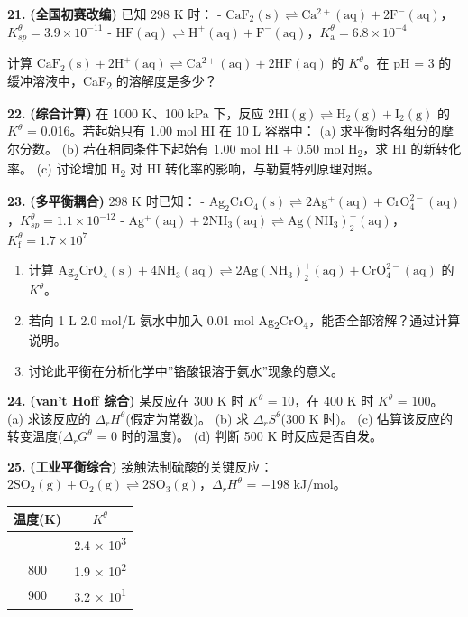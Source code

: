 \documentclass[a4paper,11pt]{ctexart}
\providecommand{\tightlist}{\setlength{\itemsep}{0pt}\setlength{\parskip}{0pt}}
\newcounter{none}
\newcommand{\箭}{\ensuremath{\rightarrow}}
\newcommand{\左箭}{\ensuremath{\leftarrow}}
\newcommand{\上箭}{\ensuremath{\uparrow}}
\newcommand{\下箭}{\ensuremath{\downarrow}}
\newcommand{\衡}{\ensuremath{\rightleftharpoons}}
\newcommand{\双箭}{\ensuremath{\leftrightarrow}}
\newcommand{\约等于}{\ensuremath{\approx}}
\newcommand{\小于等于}{\ensuremath{\leq}}
\newcommand{\大于等于}{\ensuremath{\geq}}
\newcommand{\不等于}{\ensuremath{\neq}}
\newcommand{\西格马}{\ensuremath{\sigma}}
\newcommand{\派}{\ensuremath{\pi}}
\begin{document}
\textbf{21.} \textbf{(全国初赛改编)} 已知 298 K 时：
- \(\mathrm{CaF_2(s) \rightleftharpoons Ca^{2+}(aq) + 2F^-(aq)}\)，\(K_{sp}^\theta = 3.9 \times 10^{-11}\)
- \(\mathrm{HF(aq) \rightleftharpoons H^+(aq) + F^-(aq)}\)，\(K_{\mathrm a}^\theta = 6.8 \times 10^{-4}\)

计算 \(\mathrm{CaF_2(s) + 2H^+(aq) \rightleftharpoons Ca^{2+}(aq) + 2HF(aq)}\) 的 \(K^\theta\)。在 pH = 3 的缓冲溶液中，CaF\textsubscript{2} 的溶解度是多少？

\textbf{22.} \textbf{(综合计算)} 在 1000 K、100 kPa 下，反应 \(\mathrm{2HI(g) \rightleftharpoons H_2(g) + I_2(g)}\) 的 \(K^\theta\) = 0.016。若起始只有 1.00 mol HI 在 10 L 容器中：
(a) 求平衡时各组分的摩尔分数。
(b) 若在相同条件下起始有 1.00 mol HI + 0.50 mol H\textsubscript{2}，求 HI 的新转化率。
(c) 讨论增加 H\textsubscript{2} 对 HI 转化率的影响，与勒夏特列原理对照。

\textbf{23.} \textbf{(多平衡耦合)} 298 K 时已知：
- \(\mathrm{Ag_2CrO_4(s) \rightleftharpoons 2Ag^+(aq) + CrO_4^{2-}(aq)}\)，\(K_{sp}^\theta = 1.1 \times 10^{-12}\)
- \(\mathrm{Ag^+(aq) + 2NH_3(aq) \rightleftharpoons Ag(NH_3)_2^+(aq)}\)，\(K_{\mathrm f}^\theta = 1.7 \times 10^7\)

\begin{enumerate}
\def\labelenumi{(\alph{enumi})}
\tightlist
\item
  计算 \(\mathrm{Ag_2CrO_4(s) + 4NH_3(aq) \rightleftharpoons 2Ag(NH_3)_2^+(aq) + CrO_4^{2-}(aq)}\) 的 \(K^\theta\)。
\item
  若向 1 L 2.0 mol/L 氨水中加入 0.01 mol Ag\textsubscript{2}CrO\textsubscript{4}，能否全部溶解？通过计算说明。
\item
  讨论此平衡在分析化学中''铬酸银溶于氨水''现象的意义。
\end{enumerate}

\textbf{24.} \textbf{(van't Hoff 综合)} 某反应在 300 K 时 \(K^\theta\) = 10，在 400 K 时 \(K^\theta\) = 100。
(a) 求该反应的 \(\Delta_r H^\theta\)(假定为常数)。
(b) 求 \(\Delta_r S^\theta\)(300 K 时)。
(c) 估算该反应的转变温度(\(\Delta_r G^\theta\) = 0 时的温度)。
(d) 判断 500 K 时反应是否自发。

\textbf{25.} \textbf{(工业平衡综合)} 接触法制硫酸的关键反应：\(\mathrm{2SO_2(g) + O_2(g) \rightleftharpoons 2SO_3(g)}\)，\(\Delta_r H^\theta\) = −198 kJ/mol。

{\def\LTcaptype{none} %
\begin{longtable}[]{@{}cc@{}}
\toprule\noalign{}
温度(K) & \(K^\theta\) \\
\midrule\noalign{}
\endhead
\bottomrule\noalign{}
\endlastfoot
700 & 2.4 × 10\textsuperscript{3} \\
800 & 1.9 × 10\textsuperscript{2} \\
900 & 3.2 × 10\textsuperscript{1} \\
\end{longtable}
}
\end{document}
